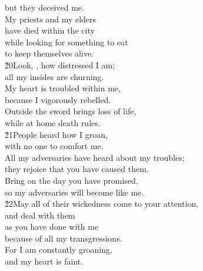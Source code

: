 \begin{poetry}
\poemll    but they deceived me. \\
\poeml My priests and my elders \\
\poemll    have died within the city \\
\poeml while looking for something to eat \\
\poemll    to keep themselves alive. \\
\poeml \v{20}Look, , how distressed I am; \\
\poemll    all my insides are churning. \\
\poeml My heart is troubled within me, \\
\poemll    because I vigorously rebelled. \\
\poeml Outside the sword brings loss of life, \\
\poemll    while at home death rules. \\
\poeml \v{21}People heard how I groan, \\
\poemll    with no one to comfort me. \\
\poeml All my adversaries have heard about my troubles; \\
\poemll    they rejoice that you have caused them. \\
\poeml Bring on the day you have promised, \\
\poemll    so my adversaries will become like me. \\
\poeml \v{22}May all of their wickedness come to your attention, \\
\poemll    and deal with them \\
\poeml as you have done with me \\
\poemll    because of all my transgressions. \\
\poeml For I am constantly groaning, \\
\poemll    and my heart is faint.
\end{poetry}


